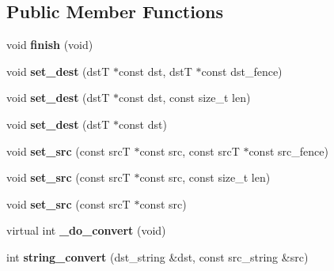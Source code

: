 \subsection*{Public Member Functions}
\begin{DoxyCompactItemize}
\item 
\hypertarget{class__IconvBase_abebdb5e31f925e2080f443cb03ea5750}{void {\bfseries finish} (void)}\label{class__IconvBase_abebdb5e31f925e2080f443cb03ea5750}

\item 
\hypertarget{class__IconvBase_a07528597df9f80af3591a76a35431dff}{void {\bfseries set\-\_\-dest} (dst\-T $\ast$const dst, dst\-T $\ast$const dst\-\_\-fence)}\label{class__IconvBase_a07528597df9f80af3591a76a35431dff}

\item 
\hypertarget{class__IconvBase_a1e833fe93b08d8799573f886a0675935}{void {\bfseries set\-\_\-dest} (dst\-T $\ast$const dst, const size\-\_\-t len)}\label{class__IconvBase_a1e833fe93b08d8799573f886a0675935}

\item 
\hypertarget{class__IconvBase_a6f439ed27777d11448780dcc13cccf79}{void {\bfseries set\-\_\-dest} (dst\-T $\ast$const dst)}\label{class__IconvBase_a6f439ed27777d11448780dcc13cccf79}

\item 
\hypertarget{class__IconvBase_ab2db6d95cded73ba095d44571c346cf8}{void {\bfseries set\-\_\-src} (const src\-T $\ast$const src, const src\-T $\ast$const src\-\_\-fence)}\label{class__IconvBase_ab2db6d95cded73ba095d44571c346cf8}

\item 
\hypertarget{class__IconvBase_aa9eb45893208a6f7fb88cca6dc4842d3}{void {\bfseries set\-\_\-src} (const src\-T $\ast$const src, const size\-\_\-t len)}\label{class__IconvBase_aa9eb45893208a6f7fb88cca6dc4842d3}

\item 
\hypertarget{class__IconvBase_ad1be8ade68f5237d19772cb32c79568e}{void {\bfseries set\-\_\-src} (const src\-T $\ast$const src)}\label{class__IconvBase_ad1be8ade68f5237d19772cb32c79568e}

\item 
\hypertarget{class__IconvBase_a4c30cea323d75fe35cac7d8502e9f2f1}{virtual int {\bfseries \-\_\-do\-\_\-convert} (void)}\label{class__IconvBase_a4c30cea323d75fe35cac7d8502e9f2f1}

\item 
\hypertarget{class__IconvBase_a3e8eccc864673fcd724409b1a15f9bcc}{int {\bfseries string\-\_\-convert} (dst\-\_\-string \&dst, const src\-\_\-string \&src)}\label{class__IconvBase_a3e8eccc864673fcd724409b1a15f9bcc}


\end{DoxyCompactItemize}
